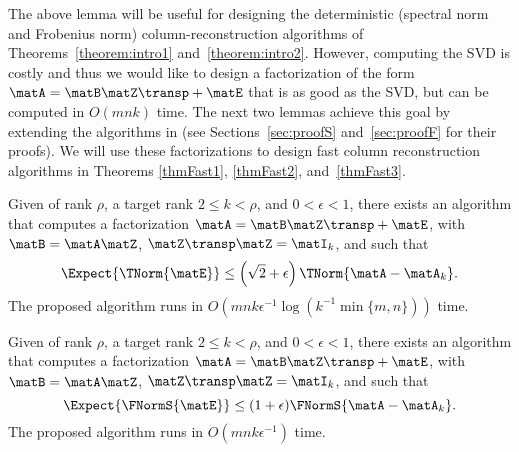 The above lemma will be useful for designing the deterministic (spectral norm and Frobenius norm) column-reconstruction algorithms of Theorems~\ref{theorem:intro1} and~\ref{theorem:intro2}. However, computing the SVD is costly and thus we would like to design a factorization of the form $\matA = \matB \matZ\transp + \matE$ that is as good as the SVD, but can be computed in $O(mnk)$ time. The next two lemmas achieve this goal by extending
the algorithms in \cite{HMT,RST09}
(see Sections~\ref{sec:proofS} and~\ref{sec:proofF} for their proofs).
We will use these factorizations to design fast column
reconstruction algorithms in Theorems \ref{thmFast1},
\ref{thmFast2}, and~\ref{thmFast3}.
\begin{lemma}
\label{tropp1}
Given  of rank $\rho$, a target rank $2\leq k < \rho$, and
$0 < \epsilon < 1$,
there exists an algorithm that
computes a factorization  $\matA = \matB \matZ\transp + \matE$, with $\matB = \matA \matZ$, $\matZ\transp\matZ = \matI_k$, and  such that
$$\Expect{\TNorm{\matE}} \leq \left(\sqrt{2}+\epsilon\right)
\TNorm{\matA - \matA_k}.$$
The proposed algorithm runs in
$O\left(mnk\epsilon^{-1}
\log\left( k^{-1}\min\{m,n\}\right)\right)$ time.
\end{lemma}
\begin{lemma}\label{tropp2}
Given  of rank $\rho$, a target rank $2\leq k < \rho$, and $0 < \epsilon < 1$, there exists an algorithm
that  computes a factorization $\matA = \matB \matZ\transp + \matE$, with $\matB = \matA \matZ$, $\matZ\transp\matZ = \matI_k$, and 
such that
$$\Expect{\FNormS{\matE}} \leq (1+{\epsilon})
\FNormS{\matA - \matA_k}.$$
The proposed algorithm runs in $O\left(mnk\epsilon^{-1}\right)$ time.
\end{lemma}

